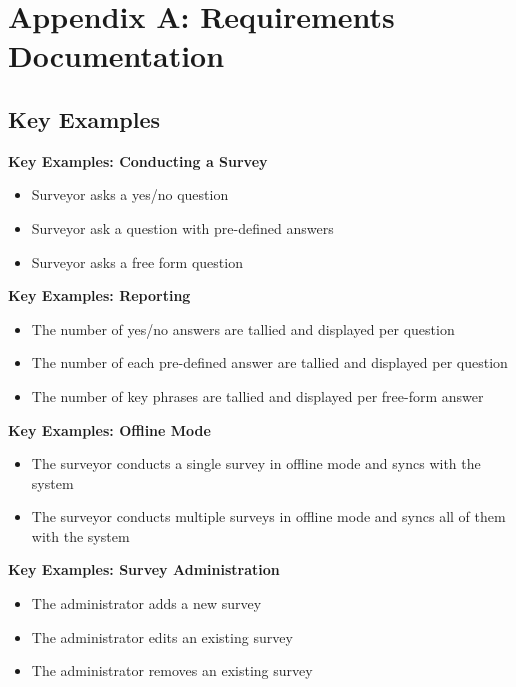 \documentclass[12pt]{witseiepaper}
\begin{document}
\renewcommand{\bibname}{REFERENCES}
\renewcommand*{\bibfont}{\raggedright}




\newpage




\section{Appendix A: Requirements  Documentation}

\subsection{Key Examples}

\textbf{Key Examples: Conducting a Survey}
\begin{itemize}
\item Surveyor asks a yes/no question 
\item Surveyor ask a question with pre-defined answers
\item Surveyor asks a free form question
\end{itemize}


\textbf{Key Examples: Reporting}
\begin{itemize}
\item The number of yes/no answers are tallied and displayed per question
\item The number of each pre-defined answer are tallied and displayed per question
\item The number of key phrases are tallied and displayed per free-form answer
\end{itemize}


\textbf{Key Examples: Offline Mode}
\begin{itemize}
\item The surveyor conducts a single survey in offline mode and syncs with the system
\item The surveyor conducts multiple surveys in offline mode and syncs all of them with the system
\end{itemize}

\textbf{Key Examples: Survey Administration}
\begin{itemize}
\item The administrator adds a new survey
\item The administrator edits an existing survey
\item The administrator removes an existing survey
\end{itemize}
\end{document}

